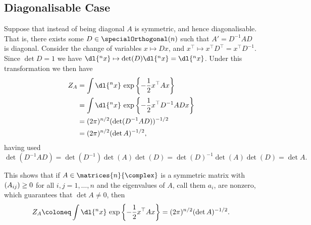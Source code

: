 \documentclass[fleqn]{NotesClass}
\let\Re\relax
\DeclareMathOperator{\Re}{Re}
\newcommand{\trans}{{\top}}
\begin{document}
    \subsection{Diagonalisable Case}
    Suppose that instead of being diagonal \(A\) is symmetric, and hence diagonalisable.
    That is, there exists some \(D \in \specialOrthogonal(n)\) such that \(A' = D^{-1}AD\) is diagonal.
    Consider the change of variables \(x \mapsto Dx\), and \(x^\trans \mapsto x^\trans D^\trans = x^{\trans}D^{-1}\).
    Since \(\det D = 1\) we have \(\dl{^nx} \mapsto \det(D) \dl{^nx} = \dl{^nx}\).
    Under this transformation we then have
    \begin{align}
        Z_A &= \int \dl{^nx} \, \exp\left\{ -\frac{1}{2}x^\trans Ax \right\}\\
        &= \int \dl{^nx} \, \exp\left\{ -\frac{1}{2}x^\trans D^{-1}ADx \right\}\\
        &= (2\pi)^{n/2}(\det(D^{-1}AD))^{-1/2}\\
        &= (2\pi)^{n/2} (\det A)^{-1/2},
    \end{align}
    having used
    \begin{equation*}
        \det(D^{-1}AD) = \det(D^{-1})\det(A)\det(D) = \det(D)^{-1}\det(A)\det(D) = \det A.
    \end{equation*}
    
    This shows that if \(A \in \matrices{n}{\complex}\) is a symmetric matrix with \(\Re(A_{ij}) \ge 0\) for all \(i, j = 1, \dotsc, n\) and the eigenvalues of \(A\), call them \(a_i\), are nonzero, which guarantees that \(\det A \ne 0\), then
    \begin{equation}
        Z_A \coloneq \int \dl{^nx} \, \exp\left\{ -\frac{1}{2}x^\trans Ax \right\} = (2\pi)^{n/2} (\det A)^{-1/2}.
    \end{equation}
    
\end{document}
